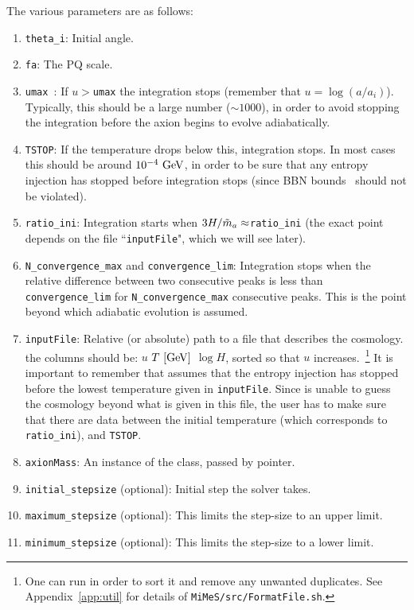 \documentclass[11pt,a4paper]{article}
\begin{document}
The various parameters are as follows:
%
\begin{enumerate}
	\item {\tt theta\_i}: Initial angle.
	\item {\tt fa}: The PQ scale.
	\item {\tt umax }: If $u>${\tt umax} the integration stops (remember that $u=\log(a/a_i)$). Typically, this should be a large number ($\sim 1000$), in order to avoid stopping the integration before the axion begins to evolve  adiabatically.    
	\item {\tt TSTOP}: If the temperature drops below this, integration stops. In most cases this should be around 
	$10^{-4}~{\rm GeV}$, in order to be sure that any entropy injection has stopped before integration stops (since BBN bounds~\cite{Kolb:206230,Peebles:1993} should not be violated).
	\item {\tt ratio\_ini}: Integration starts when $3H/\tilde m_{a}{} \approx${\tt ratio\_ini} (the exact point depends on the file ``{\tt inputFile}", which we will see later). 
	\item  {\tt N\_convergence\_max} and {\tt convergence\_lim}: Integration stops when the relative difference 
	between two consecutive peaks is less than {\tt convergence\_lim} for {\tt N\_convergence\_max} 
	consecutive peaks. This is the point beyond which adiabatic evolution is assumed.
	
	\item  {\tt inputFile}: Relative (or absolute) path to a file that describes the cosmology. the columns should be: $u$ $T ~[{\rm GeV}]$ $\log H$, sorted so that $u$ increases.~\footnote{One can run  in order to sort it and remove any unwanted duplicates. See Appendix~\ref{app:util} for details of {\tt MiMeS/src/FormatFile.sh}.}
	It is important to remember that \mimes assumes that the entropy injection has stopped before the lowest temperature given in {\tt inputFile}. Since \mimes is unable to guess the cosmology beyond what is given in this file, the user has to make sure that there are data between the initial temperature (which corresponds to {\tt ratio\_ini}), and {\tt TSTOP}.
	
	\item {\tt axionMass}: An instance of the  class, passed by pointer. 
	
	\item {\tt initial\_stepsize} (optional): Initial step the solver takes. 
	
	\item {\tt maximum\_stepsize} (optional): This limits the step-size to an upper limit. 
	\item {\tt minimum\_stepsize} (optional): This limits the step-size to a lower limit. 
	

\end{enumerate}
\end{document}
